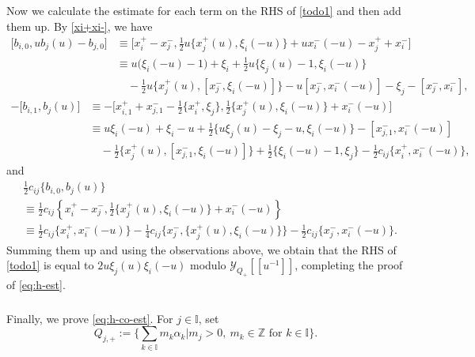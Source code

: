 \documentclass[11pt,reqno]{amsart}
\numberwithin{equation}{section}
\theoremstyle{definition}
\theoremstyle{remark}
\newcommand{\bZ}{\mathbb{Z}}
\newcommand{\I}{{\mathbb I}}
\newcommand{\Y}{{\mathscr{Y}}}
\begin{document}
Now we calculate the estimate for each term on the RHS of \eqref{todo1} and then add them up. By \eqref{xi+xi-}, we have
\begin{align*}
\bigl[b_{i,0},u b_j(u)-b_{j,0}\bigr]
&\equiv
\big[
x_i^+-x_j^-,
\tfrac{1}{2}u
 \bigl\{x_j^+(u),\xi_i(-u)\bigr\}
+u x_i^-(-u)-x_j^++x_i^-
\big]
\\
&\equiv
u\bigl(\xi_i(-u)-1\bigr)+\xi_i
+\tfrac{1}{2}u
 \bigl\{\xi_j(u)-1,\xi_i(-u)\bigr\}
\\
&\quad
-\tfrac{1}{2}u
 \bigl\{
 x_j^+(u),
 [x_j^-,\xi_i(-u)]
 \bigr\}
-u[x_j^-,x_i^-(-u)]
-\xi_j-[x_j^-,x_i^-],
\end{align*}
\begin{align*}
-\bigl[b_{i,1},b_j(u)\bigr]
&\equiv
-\big[
x_{i,1}^+ +x_{j,1}^-
-\tfrac{1}{2}\{x_i^+,\xi_j\},
\tfrac{1}{2}\{x_j^+(u),\xi_i(-u)\}
+x_i^-(-u)
\big]
\\
&\equiv
u\xi_i(-u)+\xi_i-u
+\tfrac{1}{2}
 \bigl\{
 u\xi_j(u)-\xi_j-u,\xi_i(-u)
 \bigr\}-[x_{j,1}^-,x_i^-(-u)]
\\
&\quad
-\tfrac{1}{2}
 \bigl\{
 x_j^+(u),
 [x_{j,1}^-,\xi_i(-u)]
 \bigr\}
+\tfrac{1}{2}
 \bigl\{\xi_i(-u)-1,\xi_j\bigr\}
-\tfrac{1}{2}c_{ij}
 \bigl\{x_i^+,x_i^-(-u)\bigr\},
\end{align*}
and
\begin{align*}
&\tfrac{1}{2}c_{ij}\bigl\{b_{i,0},b_j(u)\bigr\}\\
&\equiv
\tfrac{1}{2}c_{ij}
\left\{
x_i^+-x_j^-,
\tfrac{1}{2}\{x_j^+(u),\xi_i(-u)\}
+x_i^-(-u)
\right\}
\\
&\equiv
\tfrac{1}{2}c_{ij}
 \bigl\{x_i^+,x_i^-(-u)\bigr\}
-\tfrac{1}{4}c_{ij}
 \bigl\{
 x_j^-,
 \{x_j^+(u),\xi_i(-u)\}
 \bigr\}
-\tfrac{1}{2}c_{ij}
 \bigl\{x_j^-,x_i^-(-u)\bigr\}.
\end{align*}
Summing them up and using the observations above, we obtain that the RHS of \eqref{todo1} is equal to $2u\xi_j(u)\xi_i(-u)$ modulo $\Y_{Q_+}[\![u^{-1}]\!]$, completing the proof of \eqref{eq:h-est}.



\subsubsection{} \label{sssec:copro-h}

Finally, we prove \eqref{eq:h-co-est}. For $j\in\I$, set
\begin{equation*}
Q_{j,+}:=
\Big\{\sum_{k\in\I}m_k\alpha_k
\mathrel{\Big|}m_j>0,\ m_k\in\bZ\text{ for }k\in\I\Big\}.
\end{equation*}
\end{document}
